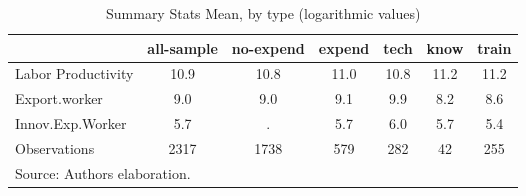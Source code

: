 \begin{table}[htbp]\centering
\def\sym#1{\ifmmode^{#1}\else\(^{#1}\)\fi}
\caption{Summary Stats Mean, by type (logarithmic values)}
\begin{tabular}{l*{6}{c}}
\hline\hline
                    &  all-sample&   no-expend&      expend&        tech&        know&       train\\
\hline
Labor Productivity  &        10.9&        10.8&        11.0&        10.8&        11.2&        11.2\\
Export.worker       &         9.0&         9.0&         9.1&         9.9&         8.2&         8.6\\
Innov.Exp.Worker    &         5.7&           .&         5.7&         6.0&         5.7&         5.4\\
\hline
Observations        &        2317&        1738&         579&         282&          42&         255\\
\hline\hline
\multicolumn{7}{l}{\footnotesize Source: Authors elaboration.}\\
\end{tabular}
\end{table}
